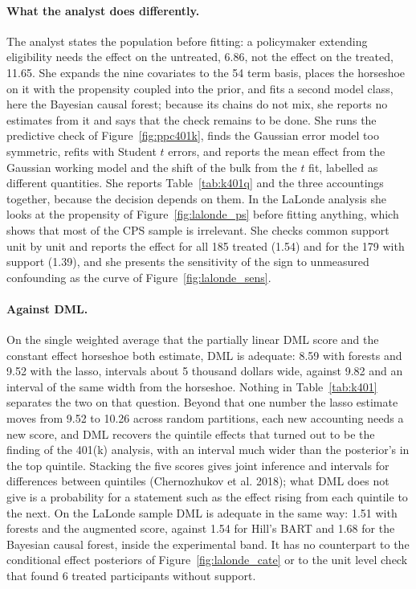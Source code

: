 \paragraph{What the analyst does differently.} The analyst states the population before fitting: a policymaker extending eligibility needs the effect on the untreated, 6.86, not the effect on the treated, 11.65. She expands the nine covariates to the 54 term basis, places the horseshoe on it with the propensity coupled into the prior, and fits a second model class, here the Bayesian causal forest; because its chains do not mix, she reports no estimates from it and says that the check remains to be done. She runs the predictive check of Figure~\ref{fig:ppc401k}, finds the Gaussian error model too symmetric, refits with Student $t$ errors, and reports the mean effect from the Gaussian working model and the shift of the bulk from the $t$ fit, labelled as different quantities. She reports Table~\ref{tab:k401q} and the three accountings together, because the decision depends on them. In the LaLonde analysis she looks at the propensity of Figure~\ref{fig:lalonde_ps} before fitting anything, which shows that most of the CPS sample is irrelevant. She checks common support unit by unit and reports the effect for all 185 treated (1.54) and for the 179 with support (1.39), and she presents the sensitivity of the sign to unmeasured confounding as the curve of Figure~\ref{fig:lalonde_sens}.

\paragraph{Against DML.} On the single weighted average that the partially linear DML score and the constant effect horseshoe both estimate, DML is adequate: 8.59 with forests and 9.52 with the lasso, intervals about 5 thousand dollars wide, against 9.82 and an interval of the same width from the horseshoe. Nothing in Table~\ref{tab:k401} separates the two on that question. Beyond that one number the lasso estimate moves from 9.52 to 10.26 across random partitions, each new accounting needs a new score, and DML recovers the quintile effects that turned out to be the finding of the 401(k) analysis, with an interval much wider than the posterior's in the top quintile. Stacking the five scores gives joint inference and intervals for differences between quintiles (Chernozhukov et al. 2018); what DML does not give is a probability for a statement such as the effect rising from each quintile to the next. On the LaLonde sample DML is adequate in the same way: 1.51 with forests and the augmented score, against 1.54 for Hill's BART and 1.68 for the Bayesian causal forest, inside the experimental band. It has no counterpart to the conditional effect posteriors of Figure~\ref{fig:lalonde_cate} or to the unit level check that found 6 treated participants without support.

